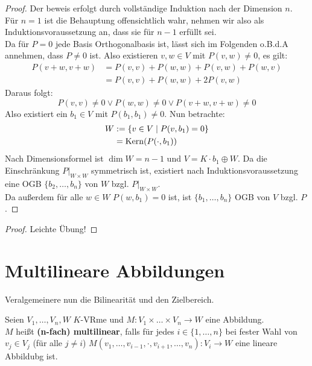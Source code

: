 \documentclass[parskip,a4paper,twoside,DIV15,BCOR12mm]{scrbook}
\begin{document}
\begin{proof}
Der beweis erfolgt durch vollständige Induktion nach der Dimension $n$.\\
Für $n=1$ ist die Behauptung offensichtlich wahr, nehmen wir also als Induktionsvoraussetzung an,
dass sie für $n-1$ erfüllt sei.\\
Da für $P=0$ jede Basis Orthogonalbasis ist, lässt sich im Folgenden o.B.d.A annehmen,
dass $P\ne 0$ ist. Also existieren $v,w\in V$ mit $P(v,w)\ne 0$, es gilt:
\begin{align*}
P(v+w,v+w)&=P(v,v)+P(w,w)+P(v,w)+P(w,v)\\
&= P(v,v)+P(w,w)+2P(v,w)
\end{align*}
Daraus folgt:
\[P(v,v)\ne 0 \vee P(w,w)\ne 0 \vee P(v+w,v+w)\ne 0\]
Also existiert ein $b_1\in V$ mit $P(b_1,b_1)\ne 0$. Nun betrachte:
\begin{align*}
W&:=\{v\in V\mid P(v,b_1)=0\}\\
&=\operatorname{Kern}(P(\cdot,b_1))
\end{align*}
Nach Dimensionsformel ist $\dim W=n-1$ und $V=K\cdot b_1 \oplus W$. Da die 
Einschränkung $P|_{W\times W}$ symmetrisch ist, existiert nach Induktionsvoraussetzung
eine OGB $\{b_2,\ldots,b_n\}$ von $W$ bzgl. $P|_{W\times W}$.\\
Da außerdem für alle $w\in W$ $P(w,b_1)=0$ ist, ist
$\{b_1,\ldots,b_n\}$ OGB von $V$ bzgl. $P$.
\end{proof}

\begin{comment}[Fourierformel]
\index{Fourierformel}
Die Basisdarstellung bzgl. einer ONB $B$ lautet:
\[v=\sum_{b\in B}P(v,b)\cdot b\]
\end{comment}

\begin{proof}
Leichte Übung!
\end{proof}

\section{Multilineare Abbildungen}
Veralgemeinere nun die Bilinearität und den Zielbereich.

\begin{definition}
Seien $V_1,\ldots,V_n,W$ $K$-VRme und $M:V_1\times\ldots\times V_n\to W$ eine Abbildung.\\
$M$ heißt \textbf{(n-fach) multilinear}, falls für jedes $i\in\{1,\ldots,n\}$ bei fester
Wahl von $v_j\in V_j$ (für alle $j\ne i$) $M(v_1,\ldots,v_{i-1},\cdot,v_{i+1},\ldots,v_n):V_i\to W$
eine lineare Abbildubg ist.
\end{definition}
\end{document}
